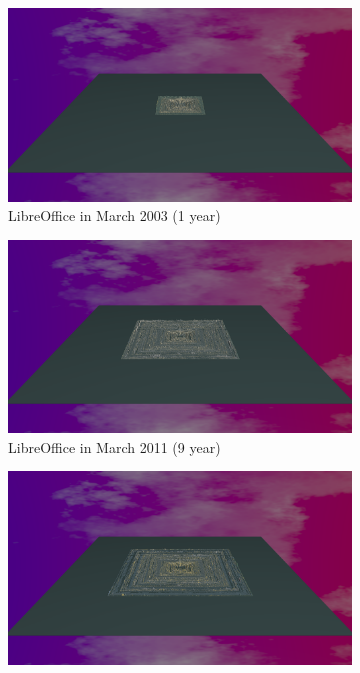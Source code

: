 \begin{figure}[ht]
    \begin{subfigure}{0.48\textwidth}
        \includegraphics[width=\linewidth]{Libreoffice/Animation001.png}
        \caption{LibreOffice in March 2003 (1 year)} 
        \label{fig:Libre_V6_S1}
    \end{subfigure}\hspace*{\fill}
    \begin{subfigure}{0.48\textwidth}
        \includegraphics[width=\linewidth]{Libreoffice/Animation009.png}
        \caption{LibreOffice in March 2011 (9 year)} 
        \label{fig:Libre_V6_S2}
    \end{subfigure}
    \medskip
    \begin{subfigure}{0.48\textwidth}
        \includegraphics[width=\linewidth]{Libreoffice/Animation010.png}

\end{subfigure}
\end{figure}
